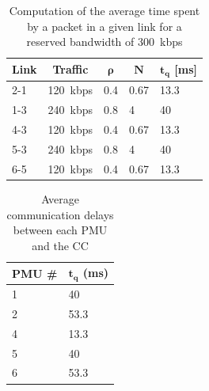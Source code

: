 \begin{table}
\centering
\caption{Computation of the average time spent by a packet in a given link for a reserved bandwidth of 300~kbps}
\label{tab:delayLink}
\begin{tabular}{|l|l|l|l|l|}
\hline
\multicolumn{1}{|c|}{\textbf{Link}} &
  \multicolumn{1}{c|}{\textbf{Traffic}} &
  \multicolumn{1}{c|}{\textbf{\(\bm{\rho}\)}} &
  \multicolumn{1}{c|}{\textbf{\(\bm{N}\)}} &
  \multicolumn{1}{c|}{\textbf{\(\bm{t_q}\) [ms]}} \\ \hline
2-1 & 120~kbps & 0.4 & 0.67 & 13.3 \\ \hline
1-3 & 240~kbps & 0.8 & 4    & 40   \\ \hline
4-3 & 120~kbps & 0.4 & 0.67 & 13.3 \\ \hline
5-3 & 240~kbps & 0.8 & 4    & 40   \\ \hline
6-5 & 120~kbps & 0.4 & 0.67 & 13.3 \\ \hline
\end{tabular}
\end{table}

\begin{table}
\centering
\caption{Average communication delays between each PMU and the CC}
\label{tab:delayPMU}
\begin{tabular}{|l|l|}
\hline
\multicolumn{1}{|c|}{\textbf{PMU \#}} & \multicolumn{1}{c|}{\textbf{\(\bm{t_q}\) (ms)}} \\ \hline
1                                    & 40                                     \\ \hline
2                                    & 53.3                                   \\ \hline
4                                    & 13.3                                   \\ \hline
5                                    & 40                                     \\ \hline
6                                    & 53.3                                   \\ \hline
\end{tabular}
\end{table}


